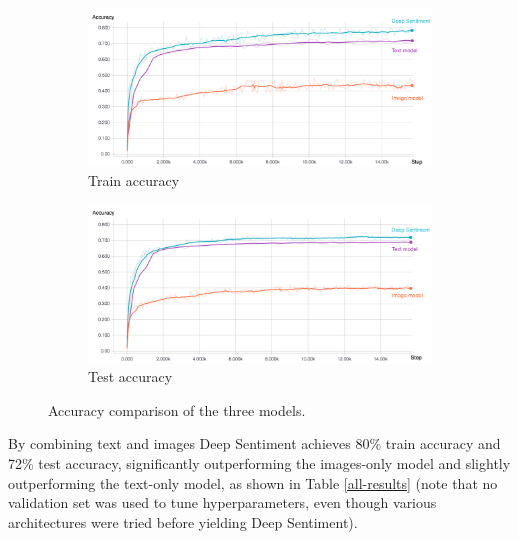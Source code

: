 \documentclass{article} %
\begin{document}
\begin{figure}[H]
    \begin{subfigure}[t]{.5\textwidth}
        \vskip 0pt %
        \centering
        \includegraphics[width=\linewidth]{Images/train.pdf}
        \caption{Train accuracy}
   \end{subfigure}
   \begin{subfigure}[t]{.5\textwidth}
       \vskip 0pt
       \centering
       \includegraphics[width=\linewidth]{Images/validation.pdf}
       \caption{Test accuracy}
    \end{subfigure}
    \caption{Accuracy comparison of the three models.}
    \label{train-test}
\end{figure}

By combining text and images Deep Sentiment achieves 80\% train accuracy and 72\% test accuracy, significantly outperforming the images-only model and slightly outperforming the text-only model, as shown in Table \ref{all-results} (note that no validation set was used to tune hyperparameters, even though various architectures were tried before yielding Deep Sentiment).
\end{document}
